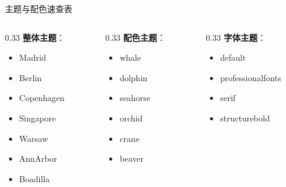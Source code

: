 \documentclass[UTF8,11pt,aspectratio=169]{beamer}
\begin{document}
\begin{frame}{主题与配色速查表}
    \begin{columns}[T]
        \begin{column}{0.33\textwidth}
            \textbf{整体主题}：
            \begin{itemize}
                \footnotesize
                \item Madrid
                \item Berlin
                \item Copenhagen
                \item Singapore
                \item Warsaw
                \item AnnArbor
                \item Boadilla
            \end{itemize}
        \end{column}
        \begin{column}{0.33\textwidth}
            \textbf{配色主题}：
            \begin{itemize}
                \footnotesize
                \item whale
                \item dolphin
                \item seahorse
                \item orchid
                \item crane
                \item beaver
            \end{itemize}
        \end{column}
        \begin{column}{0.33\textwidth}
            \textbf{字体主题}：
            \begin{itemize}
                \footnotesize
                \item default
                \item professionalfonts
                \item serif
                \item structurebold
            \end{itemize}
        \end{column}
    \end{columns}
\end{frame}

\end{document}
